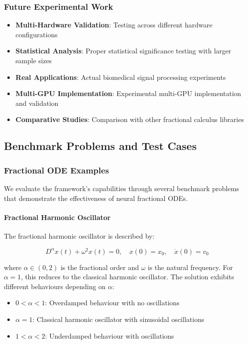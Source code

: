 \subsubsection{Future Experimental Work}

\begin{itemize}
    \item \textbf{Multi-Hardware Validation}: Testing across different hardware configurations
    \item \textbf{Statistical Analysis}: Proper statistical significance testing with larger sample sizes
    \item \textbf{Real Applications}: Actual biomedical signal processing experiments
    \item \textbf{Multi-GPU Implementation}: Experimental multi-GPU implementation and validation
    \item \textbf{Comparative Studies}: Comparison with other fractional calculus libraries
\end{itemize}

\subsection{Benchmark Problems and Test Cases}

\subsubsection{Fractional ODE Examples}

We evaluate the framework's capabilities through several benchmark problems that demonstrate the effectiveness of neural fractional ODEs.

\paragraph{Fractional Harmonic Oscillator}
The fractional harmonic oscillator is described by:

\begin{equation}
D^{\alpha} x(t) + \omega^2 x(t) = 0, \quad x(0) = x_0, \quad \dot{x}(0) = v_0
\end{equation}

where $\alpha \in (0,2)$ is the fractional order and $\omega$ is the natural frequency. For $\alpha = 1$, this reduces to the classical harmonic oscillator. The solution exhibits different behaviours depending on $\alpha$:

\begin{itemize}
    \item $0 < \alpha < 1$: Overdamped behaviour with no oscillations
    \item $\alpha = 1$: Classical harmonic oscillator with sinusoidal oscillations
    \item $1 < \alpha < 2$: Underdamped behaviour with oscillations
\end{itemize}

